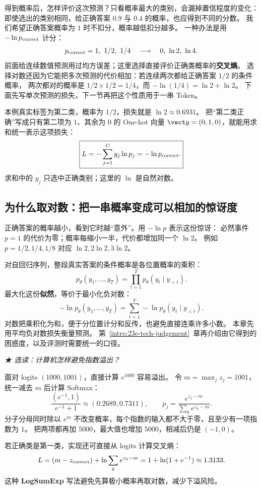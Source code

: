 得到概率后，怎样评价这次预测？只看概率最大的类别，会漏掉置信程度的变化：
即使选出的类别相同，给正确答案 $0.9$ 与 $0.4$ 的概率，也应得到不同的分数。
我们希望正确答案概率为 $1$ 时不扣分，概率越低扣分越多。
一种办法是用 $-\ln p_{\rm correct}$ 计分：
\[
p_{\rm correct}=1,\ 1/2,\ 1/4
\quad\longrightarrow\quad
0,\ \ln2,\ \ln4.
\]
前面给连续数值预测用过均方误差；这里选择直接评价正确类概率的\textbf{交叉熵}。
选择对数还因为它能把多次预测的代价相加：若连续两次都给正确答案 $1/2$ 的条件概率，
两次都对的概率是 $1/2\times1/2=1/4$，而 $-\ln(1/4)=\ln2+\ln2$。
下面先写单次预测的损失，下一节再把这个性质用于一串 Token。

本例真实标签为第二类，概率为 $1/2$，损失就是 $\ln2\approx0.6931$。
把“第二类正确”写成只有第二项为 $1$、其余为 $0$ 的 One-hot 向量
$\vect y=(0,1,0)$，就能用求和统一表示这项损失：
\begin{equation}
\boxed{L=-\sum_{j=1}^{C}y_j\ln p_j=-\ln p_{\rm correct}.}
\label{eq:early-class-cross-entropy}
\end{equation}
求和中的 $y_j$ 只选中正确类别；这里的 $\ln$ 是自然对数。

\subsection{为什么取对数：把一串概率变成可以相加的惊讶度}
正确答案的概率越小，看到它时越“意外”。用 $-\ln p$ 表示这份惊讶：
必然事件 $p=1$ 的代价为零；概率每缩小一半，代价都增加同一个 $\ln2$。
例如 $p=1/2,1/4,1/8$ 对应 $\ln2,2\ln2,3\ln2$。

对自回归序列，整段真实答案的条件概率是各位置概率的乘积：
\[
p_\theta(y_1,\ldots,y_T)=\prod_{t=1}^T p_\theta(y_t\mid y_{<t}).
\]
最大化这份\textbf{似然}，等价于最小化负对数：
\[
-\ln p_\theta(y_1,\ldots,y_T)
=\sum_{t=1}^T-\ln p_\theta(y_t\mid y_{<t}).
\]
对数把乘积化为和，便于分位置计分和反传，也避免直接连乘许多小数。
本章先用平均负对数损失衡量预测。
第~\ref*{intro:23e-tech-judgement}~章再介绍由它得到的困惑度，以及评测时需要统一的口径。

\begin{example}
\noindent\emph{{\symboliconfont ★} 选读：计算机怎样避免指数溢出？}\par
面对 logits $(1000,1001)$，直接计算 $e^{1000}$ 容易溢出。
令 $m=\max_jz_j=1001$，统一减去 $m$ 后计算 Softmax：
\[
\frac{(e^{-1},1)}{e^{-1}+1}\approx(0.2689,0.7311),\qquad
p_j=\frac{e^{z_j-m}}{\sum_k e^{z_k-m}}.
\]
分子分母同时除以 $e^m$ 不改变概率，每个指数的输入都不大于零，且至少有一项指数为 $1$。
把两项都再加 $5000$，最大值也增加 $5000$，相减后仍是 $(-1,0)$。

若正确类是第一类，实现还可直接从 logits 计算交叉熵：
\[
L=(m-z_{\rm correct})+\ln\sum_k e^{z_k-m}
=1+\ln(1+e^{-1})\approx1.3133.
\]
这种 \textbf{LogSumExp} 写法避免先算极小概率再取对数，减少下溢风险。
\end{example}

